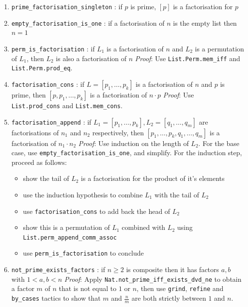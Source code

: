 \documentclass{article}
\begin{document}
\begin{enumerate}
\item \verb|prime_factorisation_singleton| : if $p$ is prime, $\left[p\right]$ is a factorisation for $p$ 

\item \verb|empty_factorisation_is_one| : if a factorisation of $n$ is the empty list then $n = 1$

\item \verb|perm_is_factorisation| : if $L_1$ is a factorisation of $n$ and $L_2$ is a permutation
of $L_1$, then $L_2$ is also a factorisation of $n$
\newline \textit{Proof}: Use \verb|List.Perm.mem_iff| and \verb|List.Perm.prod_eq|.

\item \verb|factorisation_cons| : if $L=\left[p_1,\dots,p_k\right]$ is a factorisation of $n$ and 
$p$ is prime, then $\left[p, p_1, \dots, p_k\right]$ is a factorisation of $n\cdot p$
\newline \textit{Proof}: Use \verb|List.prod_cons| and \verb|List.mem_cons|.

\item \verb|factorisation_append| : if $L_1=\left[p_1,\dots,p_k\right], L_2=\left[q_1,\dots,q_m\right]$ are factorisations of $n_1$ and $n_2$ respectively, then $\left[p_1,\dots,p_k,q_1,\dots,q_m\right]$ is a factorisation of $n_1\cdot n_2$
\newline \textit{Proof}: Use induction on the length of $L_2$. For the base case, use \verb|empty_factorisation_is_one|, and simplify. For the induction step, proceed as follows:
\begin{itemize}
  \item show the tail of $L_2$ is a factorisation for the product of it's elements 
  \item use the induction hypothesis to combine $L_1$ with the tail of $L_2$
  \item use \verb|factorisation_cons| to add back the head of $L_2$
  \item show this is a permutation of $L_1$ combined with $L_2$ using \verb|List.perm_append_comm_assoc|
  \item use \verb|perm_is_factorisation| to conclude
\end{itemize}

\item \verb|not_prime_exists_factors| : if $n \ge 2$ is composite then it has factors $a, b$ with $1 < a, b < n$ 
\newline \textit{Proof}: Apply \verb|Nat.not_prime_iff_exists_dvd_ne| to obtain a factor $m$ of 
$n$ that is not equal to $1$ or $n$, then use \verb|grind|, \verb|refine| and \verb|by_cases| 
tactics to show that $m$ and $\frac{n}{m}$ are both strictly between $1$ and $n$.


\end{enumerate}
\end{document}
